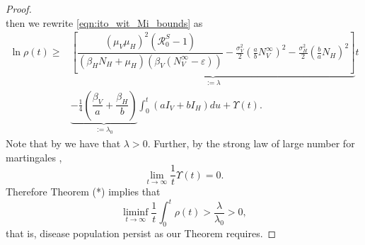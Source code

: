 \begin{proof}
$$    $$
    then we rewrite \eqref{eqn:ito_wit_Mi_bounds} as
    \begin{equation} \label{eqn:ito_wit_Mi_bounds_new_notation}
        \begin{aligned}
            \ln \rho(t) 
            \geq &
                \underbrace{
                    \left[
                        \dfrac{
                            (\mu_V \mu_H) ^ 2 (\mathcal{R}_0 ^ S - 1)
                        }{
                            (\beta_H N_H + \mu_H) 
                            (\beta_V \left(N_V ^ {\infty} -\varepsilon\right))
                        }
                        -
                        \frac{\sigma_V ^ 2}{2}
                        \left(
                            \frac{a}{b} N_V ^ \infty
                        \right) ^2
                        -
                        \frac{\sigma_H ^ 2}{2}
                        \left(
                            \frac{b}{a}
                            N_H
                        \right) ^ 2
                    \right]
                }_{:= \lambda}
                t
            \\
            &
            \underbrace{
                -\frac{1}{4}
                \left(
                    \dfrac{\beta_V}{a}
                    +
                    \dfrac{\beta_H}{b}
                \right)
            }_{:= \lambda_0}
            \int_{0} ^ t
                \left(
                    a I_V + b I_H
                \right)
                du
            +
            \varUpsilon(t).
        \end{aligned}
    \end{equation}
    Note that by  we have that $\lambda > 0$.
    Further, by the strong law of large number for martingales 
    \citet[p. 12,][]{Mao2007},
    $$
        \lim_{t \to \infty}
            \frac{1}{t}
            \varUpsilon (t) =0.
    $$
    Therefore Theorem (*) implies that
    $$
        \liminf_{t \to \infty} 
            \frac{1}{t}\int_0 ^ t 
                \rho(t) 
            > \dfrac{ \lambda }{ \lambda_0} >0,
    $$
    that is, disease population persist as our Theorem requires.
\end{proof}
